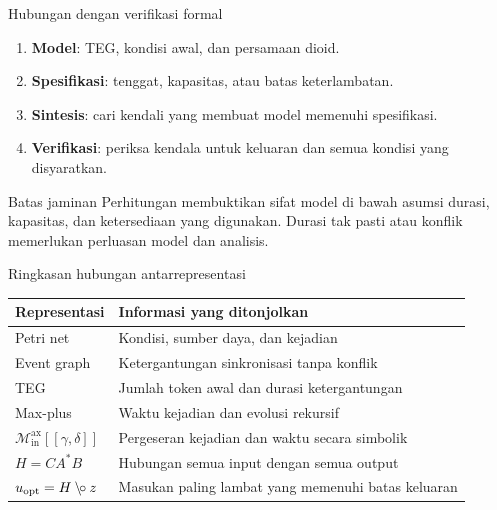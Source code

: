 \documentclass[aspectratio=169,11pt]{beamer}
\newcommand{\D}{\mathcal{M}_{\mathrm{in}}^{\mathrm{ax}}[[\gamma,\delta]]}
\newcommand{\res}{\mathbin{\backslash\!\circ}}
\begin{document}
\begin{frame}{Hubungan dengan verifikasi formal}

\begin{enumerate}
\item \textbf{Model}: TEG, kondisi awal, dan persamaan dioid.
\item \textbf{Spesifikasi}: tenggat, kapasitas, atau batas keterlambatan.
\item \textbf{Sintesis}: cari kendali yang membuat model memenuhi spesifikasi.
\item \textbf{Verifikasi}: periksa kendala untuk keluaran dan semua kondisi yang disyaratkan.
\end{enumerate}
\begin{block}{Batas jaminan}
Perhitungan membuktikan sifat model di bawah asumsi durasi,
kapasitas, dan ketersediaan yang digunakan.
Durasi tak pasti atau konflik memerlukan perluasan model dan analisis.
\end{block}

\end{frame}
\begin{frame}{Ringkasan hubungan antarrepresentasi}

\begin{center}\begin{tabular}{p{3cm}p{8.5cm}}\toprule
Representasi&Informasi yang ditonjolkan\\\midrule
Petri net&Kondisi, sumber daya, dan kejadian\\[1.5mm]
Event graph&Ketergantungan sinkronisasi tanpa konflik\\[1.5mm]
TEG&Jumlah token awal dan durasi ketergantungan\\[1.5mm]
Max-plus&Waktu kejadian dan evolusi rekursif\\[1.5mm]
$\D$&Pergeseran kejadian dan waktu secara simbolik\\[1.5mm]
$H=CA^*B$&Hubungan semua input dengan semua output\\[1.5mm]
$u_{\rm opt}=H\res z$&Masukan paling lambat yang memenuhi batas keluaran\\\bottomrule
\end{tabular}\end{center}

\end{frame}
\end{document}

